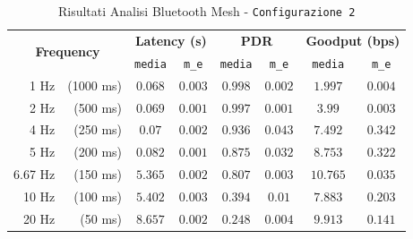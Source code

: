 \begin{table}[hbt!]
    \centering
    \begin{tabular}{ |rr|| c|c|c|c|c|c| } 
        \hline
        \multicolumn{2}{|c||}{\multirow{2}{*}{\textbf{Frequency}}} & \multicolumn{2}{|c|}{\textbf{Latency \scriptsize (s)}} & \multicolumn{2}{|c|}{\textbf{PDR}} & \multicolumn{2}{|c|}{\textbf{Goodput \scriptsize (bps)}} \\
        && \texttt{media} & \texttt{m\_e} & \texttt{media} & \texttt{m\_e} & \texttt{media} & \texttt{m\_e} \\

		\hline
		1 Hz & \scriptsize (1000 ms) & $ 0.068 $ & $ 0.003 $ & $ 0.998 $ & $ 0.002 $ & $ 1.997 $ & $ 0.004 $ \\
		\hline
		2 Hz & \scriptsize (500 ms) & $ 0.069 $ & $ 0.001 $ & $ 0.997 $ & $ 0.001 $ & $ 3.99 $ & $ 0.003 $ \\
		\hline
		4 Hz & \scriptsize (250 ms) & $ 0.07 $ & $ 0.002 $ & $ 0.936 $ & $ 0.043 $ & $ 7.492 $ & $ 0.342 $ \\
		\hline
		5 Hz & \scriptsize (200 ms) & $ 0.082 $ & $ 0.001 $ & $ 0.875 $ & $ 0.032 $ & $ 8.753 $ & $ 0.322 $ \\
		\hline
		6.67 Hz & \scriptsize (150 ms) & $ 5.365 $ & $ 0.002 $ & $ 0.807 $ & $ 0.003 $ & $ 10.765 $ & $ 0.035 $ \\
		\hline
		10 Hz & \scriptsize (100 ms) & $ 5.402 $ & $ 0.003 $ & $ 0.394 $ & $ 0.01 $ & $ 7.883 $ & $ 0.203 $ \\
		\hline
		20 Hz & \scriptsize (50 ms) & $ 8.657 $ & $ 0.002 $ & $ 0.248 $ & $ 0.004 $ & $ 9.913 $ & $ 0.141 $ \\
		\hline
    \end{tabular}
    \caption{Risultati Analisi Bluetooth Mesh - \texttt{Configurazione 2}}
    \label{tab:table_ble_conf_2}
\end{table}

